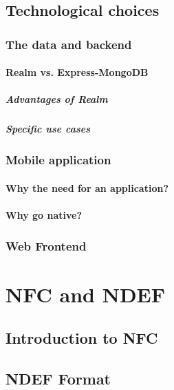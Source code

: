 \documentclass[11pt,a4paper]{report}
\begin{document}
\section{Technological choices}
\label{technological choices}
\subsection{The data and backend}
\subsubsection{Realm vs. Express-MongoDB}
\paragraph{Advantages of Realm}
\paragraph{Specific use cases}

\subsection{Mobile application}
\subsubsection{Why the need for an application?}
\subsubsection{Why go native?}

\subsection{Web Frontend}


\chapter{NFC and NDEF}
\section{Introduction to NFC}
\section{NDEF Format}
\end{document}
